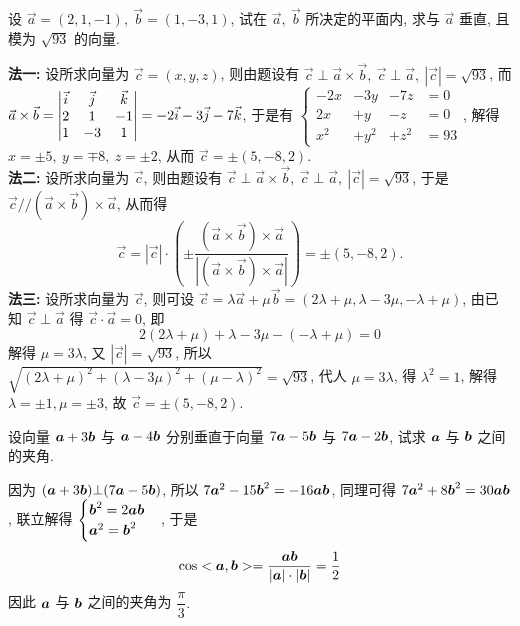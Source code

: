 \begin{example}
    设 $\vec{a}=(2,1,-1),~\vec{b}=(1,-3,1)$, 试在 $\vec{a},~\vec{b}$ 所决定的平面内, 求与 $\vec{a}$ 垂直, 且模为 $\sqrt{93}$ 的向量.
\end{example}
\begin{solution}
    \textbf{法一: }设所求向量为 $ \vec{c}=(x, y, z)$, 则由题设有 $ \vec{c} \perp \vec{a} \times \vec{b},~ \vec{c} \perp \vec{a},~|\vec{c}|=\sqrt{93}$,
    而 $ \vec{a} \times \vec{b}=\mqty|\vec{i} & \vec{j} & \vec{k} \\ 2 & 1 & -1 \\ 1 & -3 & 1|=-2 \vec{i}-3 \vec{j}-7 \vec{k}$, 于是有
    $\left\{\begin{array}{llll}
            -2x & -3y  & -7z  & =0  \\
            2x  & +y   & -z   & =0  \\
            x^2 & +y^2 & +z^2 & =93
        \end{array}\right.$, 解得 $ x=\pm 5,~ y=\mp 8,~ z=\pm 2 $, 从而 $ \vec{c}=\pm(5,-8,2) .$\\
    \textbf{法二: }设所求向量为 $ \vec{c}$, 则由题设有 $ \vec{c} \perp \vec{a} \times \vec{b},~ \vec{c} \perp \vec{a},~|\vec{c}|=\sqrt{93}$,
    于是 $ \vec{c} / /(\vec{a} \times \vec{b}) \times \vec{a}$, 从而得
    $$ \vec{c}=\left|\vec{c}\right| \cdot\left(\pm \frac{(\vec{a} \times \vec{b}) \times \vec{a}}{|(\vec{a} \times \vec{b}) \times \vec{a}|}\right)=\pm(5,-8,2) .$$
    \textbf{法三: }设所求向量为 $ \vec{c}$, 则可设 $ \vec{c}=\lambda \vec{a}+\mu \vec{b}=(2 \lambda+\mu, \lambda-3 \mu,-\lambda+\mu)$,
    由已知 $ \vec{c} \perp \vec{a} $ 得 $ \vec{c} \cdot \vec{a}=0$, 即 $$ 2(2 \lambda+\mu)+\lambda-3 \mu-(-\lambda+\mu)=0$$
    解得 $ \mu=3 \lambda$, 又 $ |\vec{c}|=\sqrt{93}$, 所以 $ \sqrt{(2 \lambda+\mu)^{2}+(\lambda-3 \mu)^{2}+(\mu-\lambda)^{2}}=\sqrt{93}$,
    代人 $ \mu=3 \lambda$, 得 $ \lambda^{2}=1$, 解得 $ \lambda=\pm 1, \mu=\pm 3$, 故 $ \vec{c}=\pm(5,-8,2) .$
\end{solution}

\begin{example}
    设向量 $\vb*{a}+3\vb*{b}$ 与 $\vb*{a}-4\vb*{b}$ 分别垂直于向量 $7\vb*{a}-5\vb*{b}$ 与 $7\vb*{a}-2\vb*{b}$, 试求 $\vb*{a}$ 与 $\vb*{b}$ 之间的夹角.
\end{example}
\begin{solution}
    因为 $\qty(\vb*{a}+3\vb*{b})\bot \qty(7\vb*{a}-5\vb*{b})$, 所以 $7\vb*{a}^2-15\vb*{b}^2=-16\vb*{ab}$, 同理可得 $7\vb*{a}^2+8\vb*{b}^2=30\vb*{ab}$,
    联立解得 $\begin{cases}
            \vb*{b}^2=2\vb*{ab} \\\vb*{a}^2=\vb*{b}^2
        \end{cases}$, 于是 $$\cos<\vb*{a},\vb*{b}>=\dfrac{\vb*{ab}}{|\vb*{a}|\cdot|\vb*{b}|}=\dfrac{1}{2}$$ 因此 $\vb*{a}$ 与 $\vb*{b}$ 之间的夹角为 $\dfrac{\pi}{3} .$
\end{solution}

